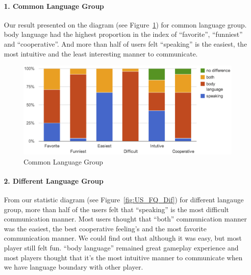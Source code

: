 \paragraph{1. Common Language Group}
Our result presented on the diagram (see Figure~\ref{fig:US_FQ_Com}) for common language group. 
body language had the highest proportion in the index of ``favorite'', ``funniest'' and ``cooperative''.
And more than half of users felt ``speaking'' is the easiest, the most intuitive and the least interesting manner to communicate.

\begin{figure}[!h]
\centering
\includegraphics[width=0.9\columnwidth]{Figures/US_FQ_Com.png}
\caption{Common Language Group}
\label{fig:US_FQ_Com}
\end{figure}

\paragraph{2. Different Language Group}
From our statistic diagram (see Figure~\ref{fig:US_FQ_Dif}) for different langauge group, more than half of the users felt that ``speaking'' is the most difficult communication manner.
Most users thought that ``both'' communication manner was the easiest, the best cooperative feeling's and the most favorite communication manner. We could find out that although it was easy, but most player still felt fun. ``body language'' remained great gameplay experience and most players thought that it's the most intuitive manner to communicate when we have language boundary with other player.

